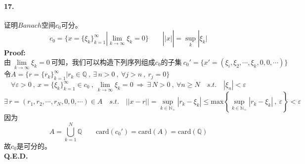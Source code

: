 \paragraph*{17.}证明$Banach$空间$c_0$可分。
\[c_0=\{x=\{\xi_k\}_{k=1}^{\infty}|\lim_{k \to \infty}\xi_k=0\} \qquad ||x||=\mathop \text{sup}\limits_{k}|\xi_k|\]
\textbf{Proof:}\\
\[\text{由} \ \lim_{k \to \infty}\xi_k=0 \ \text{可知，我们可以构造下列序列组成$c_0$的子集} \ c_0'=\{x'=(\xi_i,\xi_2,\cdots,\xi_k,0,0,\cdots)\}\]
令$A=\{r=\{r_k\}_{k=1}^{\infty}|r_k \in \mathbb{Q} \ , \ \exists \, n>0 \ , \ \forall j>n \ , \ r_j=0\}$
\[\forall \varepsilon>0 \ , \ x=\{\xi_k\}_{k=1}^{\infty} \in c_0 \ , \ \lim_{k \to \infty}\xi_k=0 \ \Rightarrow \ \exists \, N>0 \ , \ \forall n \geq N \quad s.t. \quad |\xi_n|<\varepsilon\]
\[\exists \, r=(r_1,r_2,\cdots,r_N,0,0,\cdots) \in A \quad s.t. \quad ||x-r||=\mathop \text{sup}\limits_{k \in \mathbb{N}_+}|r_k-\xi_k| \leq \text{max}\left\{\mathop \text{sup}\limits_{k \in \mathbb{N}_+}|r_k-\xi_k| \ , \ \varepsilon\right\}<\varepsilon\]
因为
\[A=\bigcup_{k=1}^N\mathbb{Q} \qquad \text{card}(c_0')=\text{card}(A)=\text{card}(\mathbb{Q})\]
故$c_0$是可分的。\\
\textbf{Q.E.D.}

